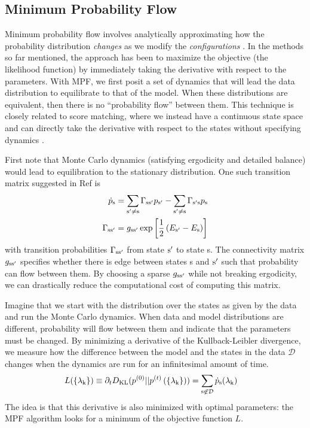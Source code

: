 \documentclass[aps,prl,twocolumn,nofootinbib]{revtex4-1}
\begin{document}
\subsection{Minimum Probability Flow}
Minimum probability flow involves analytically approximating how the probability distribution \textit{changes} as we modify the \textit{configurations} \cite{Sohl-Dickstein:2009tt,SohlDickstein:2011im}. In the methods so far mentioned, the approach has been to maximize the objective (the likelihood function) by immediately taking the derivative with respect to the parameters. With MPF, we first posit a set of dynamics that will lead the data distribution to equilibrate to that of the model. When these distributions are equivalent, then there is no ``probability flow'' between them. This technique is closely related to score matching, where we instead have a continuous state space and can directly take the derivative with respect to the states without specifying dynamics \cite{Hyvarinen:2007ed}.

First note that Monte Carlo dynamics (satisfying ergodicity and detailed balance) would lead to equilibration to the stationary distribution. One such transition matrix suggested in Ref \cite{SohlDickstein:2011im} is
\begin{align}
	\dot{p}_{\rm s} &= \sum_{\rm s'\neq s} \Gamma_{\rm ss'} p_{\rm s'} -\sum_{\rm s'\neq s} \Gamma_{\rm s's} p_{\rm s}\\
	\Gamma_{\rm ss'} &= g_{\rm ss'}\exp\left[ \frac{1}{2}\left( E_{\rm s'}-E_{\rm s} \right) \right]
\end{align}
with transition probabilities $\Gamma_{\rm ss'}$ from state ${\rm s'}$ to state s. The connectivity matrix $g_{\rm ss'}$ specifies whether there is edge between states s and ${\rm s'}$ such that probability can flow between them. By choosing a sparse $g_{\rm ss'}$ while not breaking ergodicity, we can drastically reduce the computational cost of computing this matrix.

Imagine that we start with the distribution over the states as given by the data and run the Monte Carlo dynamics. When data and model distributions are different, probability will flow between them and indicate that the parameters must be changed.  By minimizing a derivative of the Kullback-Leibler divergence, we measure how the difference between the model and the states in the data $\mathcal{D}$ changes when the dynamics are run for an infinitesimal amount of time.
\begin{align}
	L(\{\lambda_{\rm k}\}) \equiv \partial_t D_{\rm KL}(p^{(0)}||p^{(t)}\left(\{\lambda_{\rm k}\}\right)) &= \sum_{\rm s \not\in \mathcal{D}} \dot{p}_{\rm s}(\lambda_{\rm k})
\end{align}
The idea is that this derivative is also minimized with optimal parameters: the MPF algorithm looks for a minimum of the objective function $L$.
\end{document}
